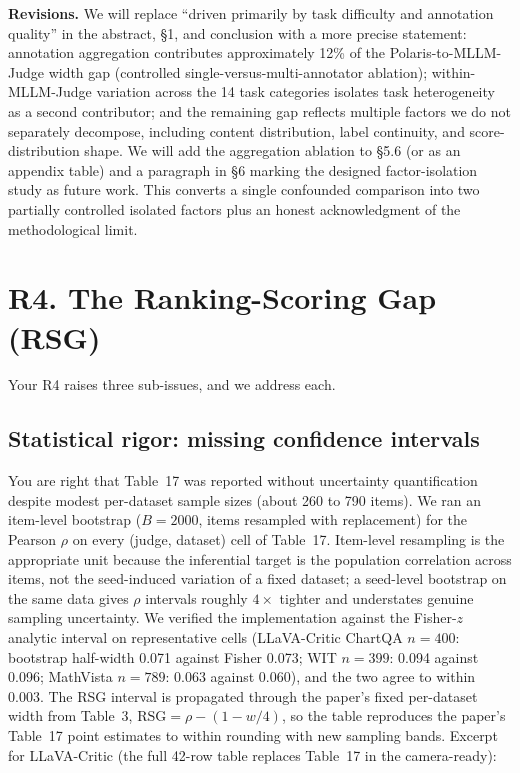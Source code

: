 \documentclass[11pt]{article}
\begin{document}
\textbf{Revisions.} We will replace ``driven primarily by task difficulty and annotation quality'' in the abstract, \S 1, and conclusion with a more precise statement: annotation aggregation contributes approximately 12\% of the Polaris-to-MLLM-Judge width gap (controlled single-versus-multi-annotator ablation); within-MLLM-Judge variation across the 14 task categories isolates task heterogeneity as a second contributor; and the remaining gap reflects multiple factors we do not separately decompose, including content distribution, label continuity, and score-distribution shape. We will add the aggregation ablation to \S 5.6 (or as an appendix table) and a paragraph in \S 6 marking the designed factor-isolation study as future work. This converts a single confounded comparison into two partially controlled isolated factors plus an honest acknowledgment of the methodological limit.

\section*{R4. The Ranking-Scoring Gap (RSG)}

Your R4 raises three sub-issues, and we address each.

\subsection*{Statistical rigor: missing confidence intervals}

You are right that Table~17 was reported without uncertainty quantification despite modest per-dataset sample sizes (about 260 to 790 items). We ran an item-level bootstrap ($B = 2000$, items resampled with replacement) for the Pearson $\rho$ on every (judge, dataset) cell of Table~17. Item-level resampling is the appropriate unit because the inferential target is the population correlation across items, not the seed-induced variation of a fixed dataset; a seed-level bootstrap on the same data gives $\rho$ intervals roughly $4\times$ tighter and understates genuine sampling uncertainty. We verified the implementation against the Fisher-$z$ analytic interval on representative cells (LLaVA-Critic ChartQA $n=400$: bootstrap half-width 0.071 against Fisher 0.073; WIT $n=399$: 0.094 against 0.096; MathVista $n=789$: 0.063 against 0.060), and the two agree to within 0.003. The RSG interval is propagated through the paper's fixed per-dataset width from Table~3, $\text{RSG} = \rho - (1 - w/4)$, so the table reproduces the paper's Table~17 point estimates to within rounding with new sampling bands. Excerpt for LLaVA-Critic (the full 42-row table replaces Table~17 in the camera-ready):
\end{document}
